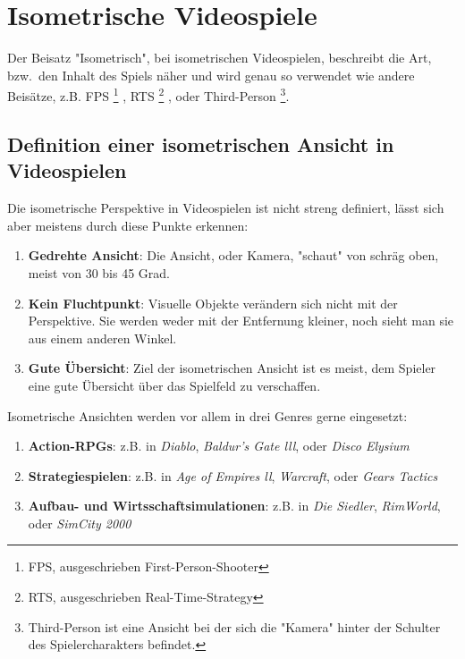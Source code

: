 \chapter{Isometrische Videospiele}
\label{cha:Diplomschrift}

Der Beisatz "Isometrisch", bei isometrischen Videospielen, beschreibt die Art, bzw.\ den Inhalt des Spiels näher und wird genau so verwendet wie andere Beisätze, z.B. FPS%
\footnote{FPS, ausgeschrieben First-Person-Shooter}
, RTS%
\footnote{RTS, ausgeschrieben Real-Time-Strategy}
, oder Third-Person%
\footnote{Third-Person ist eine Ansicht bei der sich die "Kamera" hinter der Schulter des Spielercharakters befindet.}.

\section{Definition einer  isometrischen Ansicht in Videospielen}

Die isometrische Perspektive in Videospielen ist nicht streng definiert, lässt sich aber meistens durch diese Punkte erkennen:

\begin{enumerate}
\item \textbf{Gedrehte Ansicht}: Die Ansicht, oder Kamera, "schaut" von schräg oben, meist von 30 bis 45 Grad.
\item \textbf{Kein Fluchtpunkt}: Visuelle Objekte verändern sich nicht mit der Perspektive. Sie werden weder mit der Entfernung kleiner, noch sieht man sie aus einem anderen Winkel.
\item \textbf{Gute Übersicht}: Ziel der isometrischen Ansicht ist es meist, dem Spieler eine gute Übersicht über das Spielfeld zu verschaffen.
\end{enumerate}


\noindent Isometrische Ansichten werden vor allem in drei Genres gerne eingesetzt:

\begin{enumerate}
	\item \textbf{Action-RPGs}: z.B.  in \emph{Diablo}, \emph{Baldur's Gate lll}, oder \emph{Disco Elysium}
	\item \textbf{Strategiespielen}: z.B. in \emph{Age of Empires ll}, \emph{Warcraft}, oder \emph{Gears Tactics}
	\item \textbf{Aufbau- und Wirtsschaftsimulationen}: z.B. in \emph{Die Siedler}, \emph{RimWorld}, oder \emph{SimCity 2000}
\end{enumerate}


